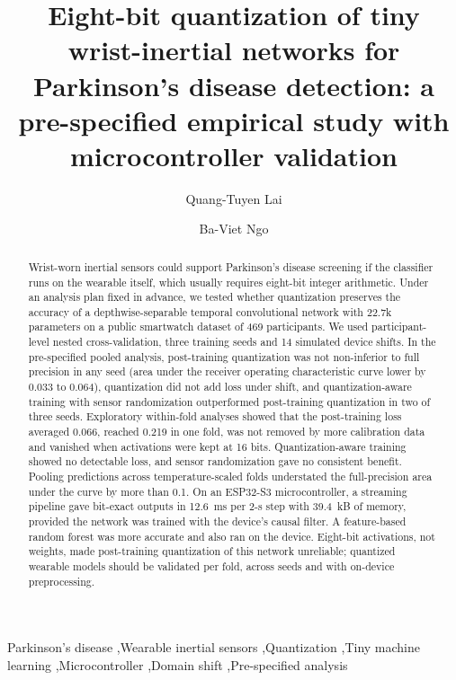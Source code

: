 \documentclass[preprint,12pt]{elsarticle}
\begin{document}
\begin{frontmatter}

\title{Eight-bit quantization of tiny wrist-inertial networks for Parkinson's disease detection: a pre-specified empirical study with microcontroller validation}

\author[hcmute]{Quang-Tuyen Lai}

\author[hcmute]{Ba-Viet Ngo}


\begin{abstract}
Wrist-worn inertial sensors could support Parkinson's disease screening if the classifier runs on the wearable itself, which usually requires eight-bit integer arithmetic. Under an analysis plan fixed in advance, we tested whether quantization preserves the accuracy of a depthwise-separable temporal convolutional network with 22.7k parameters on a public smartwatch dataset of 469 participants. We used participant-level nested cross-validation, three training seeds and 14 simulated device shifts. In the pre-specified pooled analysis, post-training quantization was not non-inferior to full precision in any seed (area under the receiver operating characteristic curve lower by 0.033 to 0.064), quantization did not add loss under shift, and quantization-aware training with sensor randomization outperformed post-training quantization in two of three seeds. Exploratory within-fold analyses showed that the post-training loss averaged 0.066, reached 0.219 in one fold, was not removed by more calibration data and vanished when activations were kept at 16 bits. Quantization-aware training showed no detectable loss, and sensor randomization gave no consistent benefit. Pooling predictions across temperature-scaled folds understated the full-precision area under the curve by more than 0.1. On an ESP32-S3 microcontroller, a streaming pipeline gave bit-exact outputs in 12.6~ms per 2-s step with 39.4~kB of memory, provided the network was trained with the device's causal filter. A feature-based random forest was more accurate and also ran on the device. Eight-bit activations, not weights, made post-training quantization of this network unreliable; quantized wearable models should be validated per fold, across seeds and with on-device preprocessing.
\end{abstract}

\begin{keyword}
Parkinson's disease \sep Wearable inertial sensors \sep Quantization \sep Tiny machine learning \sep Microcontroller \sep Domain shift \sep Pre-specified analysis
\end{keyword}

\end{frontmatter}
\end{document}
